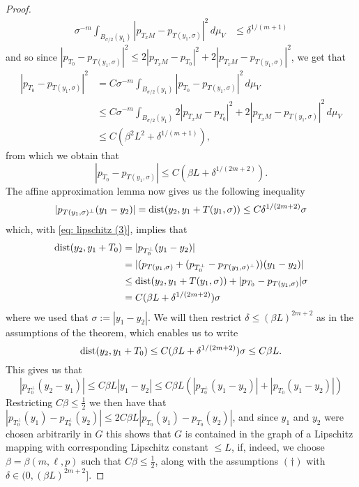 \begin{proof}
\begin{align*}
    \sigma^{-m}\int_{B_{\sigma/2}(y_1)} |p_{T_xM} - p_{T(y_1, \sigma)}|^2\, d\mu_V &\le \delta^{1/(m+1)}
\end{align*}
and so since $|p_{T_0} - p_{T(y_1, \sigma)}|^2 \le 2|p_{T_xM} - p_{T_0}|^2 + 2|p_{T_xM} - p_{T(y_1, \sigma)}|^2$, we get that
\begin{align*}
    |p_{T_0} - p_{T(y_1, \sigma)}|^2 &= C \sigma^{-m} \int_{B_{\sigma/2}(y_1)} |p_{T_0} - p_{T(y_1, \sigma)}|^2 \, d\mu_V  \\
    &\le C \sigma^{-m} \int_{B_{\sigma/2}(y_1)} 2|p_{T_xM} - p_{T_0}|^2 + 2|p_{T_xM} - p_{T(y_1, \sigma)}|^2 \, d\mu_V \\
    &\le C(\beta^2 L^2 + \delta^{1/(m+1)}),
\end{align*}
from which we obtain that
\begin{equation}
    |p_{T_0} - p_{T(y_1, \sigma)}| \le C(\beta L + \delta^{1/(2m+2)}).\label{eq: lipschitz (3)}
\end{equation}
The affine approximation lemma now gives us the following inequality
\[
    | p_{T(y_1,\sigma)^{\perp}} (y_1 - y_2) | = \operatorname{dist}(y_2, y_1 + T(y_1, \sigma)) \le C\delta^{1/(2m+2)} \sigma
\]
which, with \eqref{eq: lipschitz (3)}, implies that
\begin{align*}
    \operatorname{dist}(y_2, y_1 + T_0) &= | p_{T_0^{\perp}}(y_1 - y_2) | \\
    &= | ( p_{T(y_1, \sigma)} + (p_{T_0^{\perp}} - p_{T(y_1, \sigma)^{\perp}}))(y_1 - y_2)| \\
    &\le \operatorname{dist} (y_2, y_1 + T(y_1, \sigma)) + | p_{T_0} - p_{T(y_1, \sigma)} | \sigma \\
    &= C(\beta L + \delta^{1/(2m+2)} ) \sigma
\end{align*}
where we used that $\sigma := |y_1 - y_2|$. We will then restrict $\delta \le (\beta L)^{2m+2}$ as in the assumptions of the theorem, which enables us to write
\[
    \operatorname{dist}(y_2, y_1 + T_0) \le C(\beta L + \delta^{1/(2m+2)} ) \sigma \le C\beta L.
\]
This gives us that
\[
    |p_{T_0^{\perp}}(y_2 - y_1)| \le C\beta L|y_1 - y_2| \le C \beta L( |p_{T_0^{\perp}}(y_1 - y_2)| + |p_{T_0}(y_1 - y_2)| )
\]
Restricting $C \beta \le \frac{1}{2}$ we then have that $|p_{T_0^{\perp}}(y_1)-p_{T_0^{\perp}}(y_2)| \le 2C\beta L|p_{T_0}(y_1)-p_{T_0}(y_2)|$, and since $y_1$ and $y_2$ were chosen arbitrarily in $G$ this shows that $G$ is contained in the graph of a Lipschitz mapping with corresponding Lipschitz constant $\le L$, if, indeed, we choose $\beta = \beta(m, \ell, p)$ such that $C\beta \le \frac{1}{2}$, along with the assumptions $(\dagger)$ with $\delta \in (0,(\beta L)^{2m+2}]$.


\end{proof}
